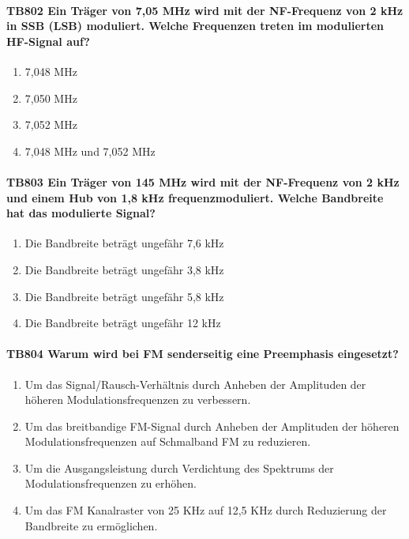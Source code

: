\documentclass[8pt]{article}
\begin{document}
\begin{enumerate}
\paragraph*{TB802 Ein Träger von 7,05 MHz wird mit der NF-Frequenz von 2 kHz in SSB (LSB) moduliert. Welche Frequenzen treten im modulierten HF-Signal auf?}
\begin{enumerate}[nolistsep,label=\Alph*]
\item 7,048 MHz
\item 7,050 MHz
\item 7,052 MHz
\item 7,048 MHz und 7,052 MHz
\end{enumerate}

\paragraph*{TB803 Ein Träger von 145 MHz wird mit der NF-Frequenz von 2 kHz und einem Hub von 1,8 kHz frequenzmoduliert. Welche Bandbreite hat das modulierte Signal?}
\begin{enumerate}[nolistsep,label=\Alph*]
\item Die Bandbreite beträgt ungefähr 7,6 kHz
\item Die Bandbreite beträgt ungefähr 3,8 kHz
\item Die Bandbreite beträgt ungefähr 5,8 kHz
\item Die Bandbreite beträgt ungefähr 12 kHz
\end{enumerate}

\paragraph*{TB804 Warum wird bei FM senderseitig eine Preemphasis eingesetzt?}
\begin{enumerate}[nolistsep,label=\Alph*]
\item Um das Signal/Rausch-Verhältnis durch Anheben der Amplituden der höheren Modulationsfrequenzen zu verbessern.
\item Um das breitbandige FM-Signal durch Anheben der Amplituden der höheren Modulationsfrequenzen auf Schmalband FM zu reduzieren.
\item Um die Ausgangsleistung durch Verdichtung des Spektrums der Modulationsfrequenzen zu erhöhen.
\item Um das FM Kanalraster von 25 KHz auf 12,5 KHz durch Reduzierung der Bandbreite zu ermöglichen.
\end{enumerate}


\end{enumerate}
\end{document}
